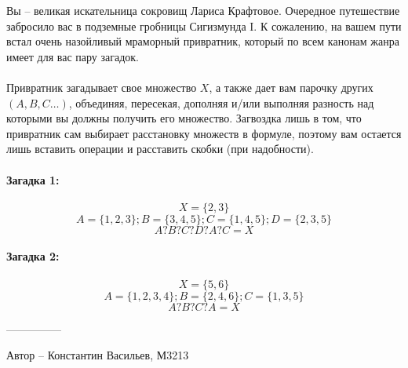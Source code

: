 \question
Вы -- великая искательница сокровищ Лариса Крафтовое. Очередное путешествие забросило вас в подземные гробницы Сигизмунда I. К сожалению, на вашем пути встал очень назойливый мраморный привратник, который по всем канонам жанра имеет для вас пару загадок.
\\
\\
Привратник загадывает свое множество $X$, а также дает вам парочку других $(A,B,C…)$, объединяя, пересекая, дополняя и/или выполняя разность над которыми вы должны получить его множество. Загвоздка лишь в том, что привратник сам выбирает расстановку множеств в формуле, поэтому вам остается лишь вставить операции и расставить скобки (при надобности).

\paragraph{Загадка 1:}
\begin{equation*}
    X=\{2,3\}
\end{equation*}
\begin{equation*}
    A=\{1,2,3\}; B=\{3,4,5\}; C=\{1,4,5\}; D=\{2,3,5\}
    \end{equation*}
\begin{equation*}
    A ? B ? C ? D ? A ? C = X
\end{equation*}

\paragraph{Загадка 2:}
\begin{equation*}
    X=\{5,6\}
\end{equation*}
\begin{equation*}
    A=\{1,2,3,4\}; B=\{2,4,6\}; C=\{1,3,5\}
    \end{equation*}
\begin{equation*}
    A ? B ? C ? A = X
\end{equation*}

---------------

Автор -- Константин Васильев, М3213